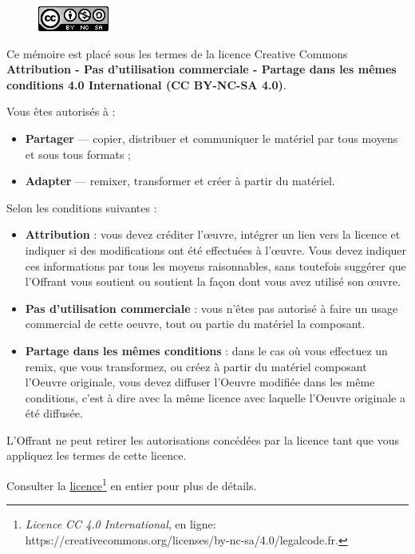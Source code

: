 \begin{figure}
    \centering
    \includegraphics{img/cc-icon.png}
    \label{fig:licence}
\end{figure}

    Ce mémoire est placé sous les termes de la licence Creative Commons \textbf{Attribution - Pas d'utilisation commerciale - Partage dans les mêmes conditions 4.0 International (CC BY-NC-SA 4.0)}.

\bigskip

    Vous êtes autorisés à :
    \begin{itemize}
        \item \textbf{Partager} --- copier, distribuer et communiquer le matériel par tous moyens et sous tous formats ;
        \item \textbf{Adapter} --- remixer, transformer et créer à partir du matériel.
    \end{itemize}

\bigskip

    Selon les conditions suivantes :
    \begin{itemize}
        \item \textbf{Attribution} : vous devez créditer l'\oe{}uvre, intégrer un lien vers la licence et indiquer si des modifications ont été effectuées à l'\oe{}uvre. Vous devez indiquer ces informations par tous les moyens raisonnables, sans toutefois suggérer que l'Offrant vous soutient ou soutient la façon dont vous avez utilisé son \oe{}uvre. 
        \item \textbf{Pas d'utilisation commerciale} : vous n'êtes pas autorisé à faire un usage commercial de cette oe{}uvre, tout ou partie du matériel la composant. 
        \item \textbf{Partage dans les mêmes conditions} : dans le cas où vous effectuez un remix, que vous transformez, ou créez à partir du matériel composant l'Oeuvre originale, vous devez diffuser l'Oeuvre modifiée dans les même conditions, c'est à dire avec la même licence avec laquelle l'Oeuvre originale a été diffusée.
    \end{itemize}

\bigskip

L'Offrant ne peut retirer les autorisations concédées par la licence tant que vous appliquez les termes de cette licence.

\bigskip

    Consulter la \href{https://creativecommons.org/licenses/by-nc-sa/4.0/legalcode.fr}{licence\footnote{
\textit{Licence CC 4.0 International}, en ligne: \url{https://creativecommons.org/licenses/by-nc-sa/4.0/legalcode.fr}.}} en entier pour plus de détails. 
